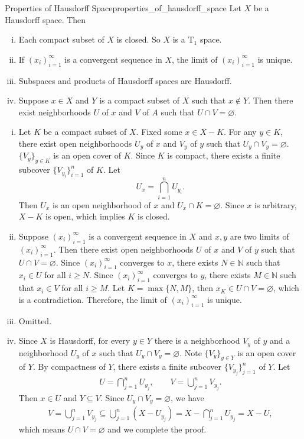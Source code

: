 \documentclass{report}
\begin{document}
\begin{proposition}{Properties of Hausdorff Space}{properties_of_hausdorff_space}
	Let $X$ be a Hausdorff space. Then
	\begin{enumerate}[(i)]
		\item Each compact subset of $X$ is closed. So $X$ is a $\mathrm{T}_1$ space.
		\item If $(x_i)_{i=1}^{\infty}$ is a convergent sequence in $X$, the limit of $(x_i)_{i=1}^{\infty}$ is unique.
		\item Subspaces and products of Hausdorff spaces are Hausdorff.
		\item Suppose $x\in X$ and $Y$ is a compact subset of $X$ such that $x\notin Y$. Then there exist neighborhoods $U$ of $x$ and $V$ of $A$ such that $U\cap V=\varnothing$.
	\end{enumerate}
\end{proposition}
\begin{prf}
	\begin{enumerate}[(i)]
		\item Let $K$ be a compact subset of $X$. Fixed some $x\in X-K$. For any $y\in K$, there exist open neighborhoods $U_y$ of $x$ and $V_y$ of $y$ such that $U_y\cap V_y=\varnothing$. $\{ V_y\}_{y\in K}$ is an open cover of $K$. Since $K$ is compact, there exists a finite subcover $\{V_{y_i}\}_{i=1}^n$ of $K$. Let 
		$$
		U_x=\bigcap_{i=1}^n U_{y_i}.
		$$
		Then $U_x$ is an open neighborhood of $x$ and $U_x\cap K=\varnothing$. Since $x$ is arbitrary, $X-K$ is open, which implies $K$ is closed. 
		\item Suppose $(x_i)_{i=1}^{\infty}$ is a convergent sequence in $X$ and $x,y$ are two limits of $(x_i)_{i=1}^{\infty}$. Then there exist open neighborhoods $U$ of $x$ and $V$ of $y$ such that $U\cap V=\varnothing$. Since $(x_i)_{i=1}^{\infty}$ converges to $x$, there exists $N\in\mathbb{N}$ such that $x_i\in U$ for all $i\ge N$. Since $(x_i)_{i=1}^{\infty}$ converges to $y$, there exists $M\in\mathbb{N}$ such that $x_i\in V$ for all $i\ge M$. Let $K=\max\{N,M\}$, then $x_K\in U\cap V=\varnothing$, which is a contradiction. Therefore, the limit of $(x_i)_{i=1}^{\infty}$ is unique.
		\item Omitted.
		\item Since $X$ is Hausdorff, for every $y\in Y$ there is a neighborhood $V_y$ of $y$ and a neighborhood $U_y$ of $x$ such that $U_y\cap V_y=\varnothing$. Note $\{V_y\}_{y\in Y}$ is an open cover of $Y$. By compactness of $Y$, there exists a finite subcover $\{V_{y_j}\}_{j=1}^n$ of $Y$. Let
		\begin{align*}
			U= \bigcap_{j=1}^n U_{y_j}, \qquad V= \bigcup_{j=1}^n V_{y_j}.
		\end{align*} 
		Then $x\in U$ and $Y\subseteq V$. Since $U_y\cap V_y=\varnothing$, we have
		\begin{align*}
			V= \bigcup_{j=1}^n V_{y_j} \subseteq \bigcup_{j=1}^n\left(X- U_{y_j}\right) = X- \bigcap_{j=1}^n U_{y_j} = X-U,
		\end{align*}
		which means $U\cap V =\varnothing$ and we complete the proof.
	\end{enumerate}
\end{prf}
\end{document}
